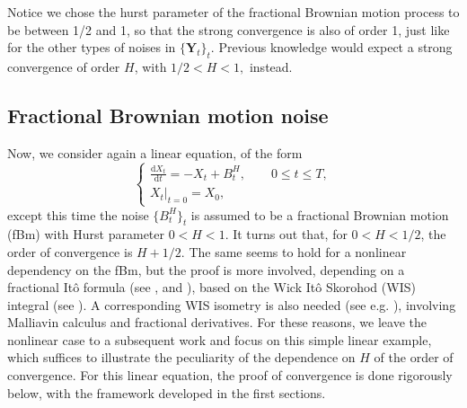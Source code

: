 \documentclass[reqno,12pt]{amsart}
\theoremstyle{plain} %
\theoremstyle{definition} %
\begin{document}
Notice we chose the hurst parameter of the fractional Brownian motion process to be between 1/2 and 1, so that the strong convergence is also of order 1, just like for the other types of noises in $\{\mathbf{Y}_t\}_t$. Previous knowledge would expect a strong convergence of order $H$, with $1/2 < H < 1,$ instead.

\subsection{Fractional Brownian motion noise}
\label{secfBmnoise}

Now, we consider again a linear equation, of the form
\begin{equation}
    \label{linearnonhomogeneousfbm}
    \begin{cases}
        \displaystyle \frac{\mathrm{d}X_t}{\mathrm{d} t} = -X_t + B^H_t, \qquad 0 \leq t \leq T, \\
        \left. X_t \right|_{t = 0} = X_0,
      \end{cases}
\end{equation}
except this time the noise $\{B^H_t\}_t$ is assumed to be a fractional Brownian motion (fBm) with Hurst parameter $0 < H < 1$. It turns out that, for $0 < H < 1/2$, the order of convergence is $H + 1/2$. The same seems to hold for a nonlinear dependency on the fBm, but the proof is more involved, depending on a fractional It\^o formula (see \cite[Theorem 4.2.6]{BHOB2008}, \cite[Theorem 4.1]{Bender2003}and \cite[Theorem 2.7.4]{Mishura2008}), based on the Wick It\^o Skorohod (WIS) integral (see \cite[Chapter 4]{BHOB2008}). A corresponding WIS isometry is also needed (see e.g. \cite[Theorem 4.5.6]{BHOB2008}), involving Malliavin calculus and fractional derivatives. For these reasons, we leave the nonlinear case to a subsequent work and focus on this simple linear example, which suffices to illustrate the peculiarity of the dependence on $H$ of the order of convergence. For this linear equation, the proof of convergence is done rigorously below, with the framework developed in the first sections.
\end{document}
